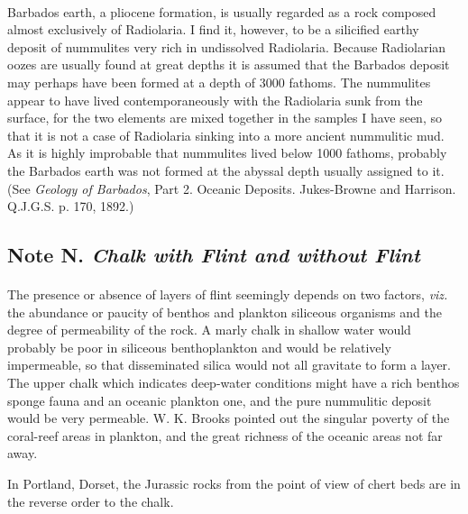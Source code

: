 \documentclass[a4paper, 12pt, oneside]{article}
\begin{document}
\paragraph{}
Barbados earth, a pliocene formation, is usually regarded as a rock composed almost exclusively of Radiolaria. I find it, however, to be a silicified earthy deposit of nummulites very rich in undissolved Radiolaria. Because Radiolarian oozes are usually found at great depths it is assumed that the Barbados deposit may perhaps have been formed at a depth of 3000 fathoms. The nummulites appear to have lived contemporaneously with the Radiolaria sunk from the surface, for the two elements are mixed together in the samples I have seen, so that it is not a case of Radiolaria sinking into a more ancient nummulitic mud. As it is highly improbable that nummulites lived below 1000 fathoms, probably the Barbados earth was not formed at the abyssal depth usually assigned to it. (See \emph{Geology of Barbados}, Part 2. Oceanic Deposits. Jukes-Browne and Harrison. Q.J.G.S. p. 170, 1892.)

\subsection{Note N. \emph{Chalk with Flint and without Flint}}
\paragraph{}
The presence or absence of layers of flint seemingly depends on two factors, \emph{viz.} the abundance or paucity of benthos and plankton siliceous organisms and the degree of permeability of the rock. A marly chalk in shallow water would probably be poor in siliceous benthoplankton and would be relatively impermeable, so that disseminated silica would not all gravitate to form a layer. The upper chalk which indicates deep-water conditions might have a rich benthos sponge fauna and an oceanic plankton one, and the pure nummulitic deposit would be very permeable. W. K. Brooks pointed out the singular poverty of the coral-reef areas in plankton, and the great richness of the oceanic areas not far away.

In Portland, Dorset, the Jurassic rocks from the point of view of chert beds are in the reverse order to the chalk.
\end{document}
